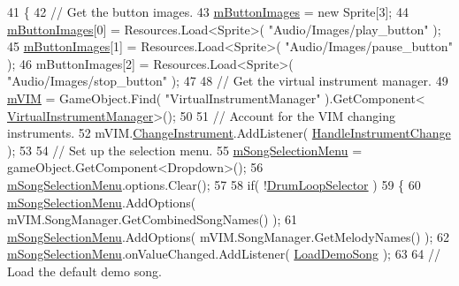 \begin{DoxyCode}
41     \{
42         \textcolor{comment}{// Get the button images.}
43         \hyperlink{class_a_t_i___demo_song_button_handler_a9d62cca93ee54ba52e0c7de5f30d9490}{mButtonImages} = \textcolor{keyword}{new} Sprite[3];
44         \hyperlink{class_a_t_i___demo_song_button_handler_a9d62cca93ee54ba52e0c7de5f30d9490}{mButtonImages}[0] = Resources.Load<Sprite>( \textcolor{stringliteral}{"Audio/Images/play\_button"} );
45         \hyperlink{class_a_t_i___demo_song_button_handler_a9d62cca93ee54ba52e0c7de5f30d9490}{mButtonImages}[1] = Resources.Load<Sprite>( \textcolor{stringliteral}{"Audio/Images/pause\_button"} );
46         mButtonImages[2] = Resources.Load<Sprite>( \textcolor{stringliteral}{"Audio/Images/stop\_button"} );
47 
48         \textcolor{comment}{// Get the virtual instrument manager.}
49         \hyperlink{class_a_t_i___demo_song_button_handler_ac078f283ce74a7b310ebb2cbbc55f70b}{mVIM} = GameObject.Find( \textcolor{stringliteral}{"VirtualInstrumentManager"} ).GetComponent<
      \hyperlink{class_virtual_instrument_manager}{VirtualInstrumentManager}>();
50 
51         \textcolor{comment}{// Account for the VIM changing instruments.}
52         mVIM.\hyperlink{group___v_i_m_events_ga1b9f12a73a5418ea5695d38b78c506c4}{ChangeInstrument}.AddListener( 
      \hyperlink{class_a_t_i___demo_song_button_handler_a2801913e33a297ae1f5db91f851ddea6}{HandleInstrumentChange} );
53 
54         \textcolor{comment}{// Set up the selection menu.}
55         \hyperlink{class_a_t_i___demo_song_button_handler_af58c5b6dd392fbf606b74188b02044ce}{mSongSelectionMenu} = gameObject.GetComponent<Dropdown>();
56         \hyperlink{class_a_t_i___demo_song_button_handler_af58c5b6dd392fbf606b74188b02044ce}{mSongSelectionMenu}.options.Clear();
57 
58         \textcolor{keywordflow}{if}( !\hyperlink{class_a_t_i___demo_song_button_handler_a772b617c22a316a99f3a4b6979d0657a}{DrumLoopSelector} )
59         \{
60             \hyperlink{class_a_t_i___demo_song_button_handler_af58c5b6dd392fbf606b74188b02044ce}{mSongSelectionMenu}.AddOptions( mVIM.SongManager.GetCombinedSongNames() );
61             \hyperlink{class_a_t_i___demo_song_button_handler_af58c5b6dd392fbf606b74188b02044ce}{mSongSelectionMenu}.AddOptions( mVIM.SongManager.GetMelodyNames() );
62             \hyperlink{class_a_t_i___demo_song_button_handler_af58c5b6dd392fbf606b74188b02044ce}{mSongSelectionMenu}.onValueChanged.AddListener( 
      \hyperlink{class_a_t_i___demo_song_button_handler_a584b9dd672e492fe0df592061c7733de}{LoadDemoSong} );
63 
64             \textcolor{comment}{// Load the default demo song.}

\end{DoxyCode}
